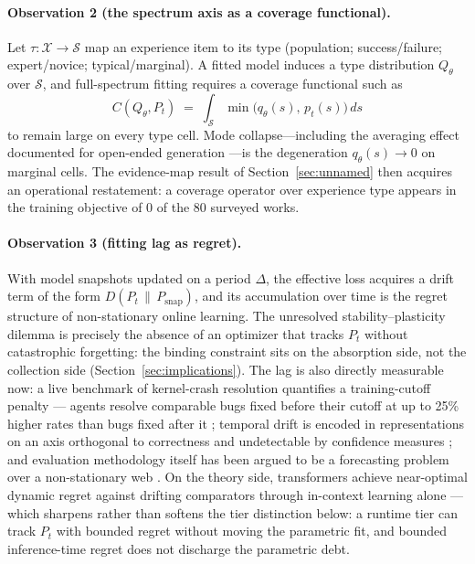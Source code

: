 \documentclass[10pt]{article}
\begin{document}
\paragraph{Observation 2 (the spectrum axis as a coverage functional).}
Let $\tau : \mathcal{X} \to \mathcal{S}$ map an experience item to its type (population; success/failure; expert/novice; typical/marginal). A fitted model induces a type distribution $Q_\theta$ over $\mathcal{S}$, and full-spectrum fitting requires a coverage functional such as
\[
C(Q_\theta, P_t) \;=\; \int_{\mathcal{S}} \min\!\big(q_\theta(s),\, p_t(s)\big)\, ds
\]
to remain large on every type cell. Mode collapse---including the averaging effect documented for open-ended generation \cite{jiang2025hivemind}---is the degeneration $q_\theta(s) \to 0$ on marginal cells. The evidence-map result of Section~\ref{sec:unnamed} then acquires an operational restatement: a coverage operator over experience type appears in the training objective of 0 of the 80 surveyed works.

\paragraph{Observation 3 (fitting lag as regret).}
With model snapshots updated on a period $\Delta$, the effective loss acquires a drift term of the form $D(P_t \,\|\, P_{\mathrm{snap}})$, and its accumulation over time is the regret structure of non-stationary online learning. The unresolved stability--plasticity dilemma \cite{wu2026agentdice} is precisely the absence of an optimizer that tracks $P_t$ without catastrophic forgetting: the binding constraint sits on the absorption side, not the collection side (Section~\ref{sec:implications}). The lag is also directly measurable now: a live benchmark of kernel-crash resolution quantifies a training-cutoff penalty --- agents resolve comparable bugs fixed before their cutoff at up to 25\% higher rates than bugs fixed after it \cite{huang2026kernel}; temporal drift is encoded in representations on an axis orthogonal to correctness and undetectable by confidence measures \cite{elbadry2026geometry}; and evaluation methodology itself has been argued to be a forecasting problem over a non-stationary web \cite{thomas2026forecasting}. On the theory side, transformers achieve near-optimal dynamic regret against drifting comparators through in-context learning alone \cite{chen2025dynamicregret} --- which sharpens rather than softens the tier distinction below: a runtime tier can track $P_t$ with bounded regret without moving the parametric fit, and bounded inference-time regret does not discharge the parametric debt.
\end{document}
